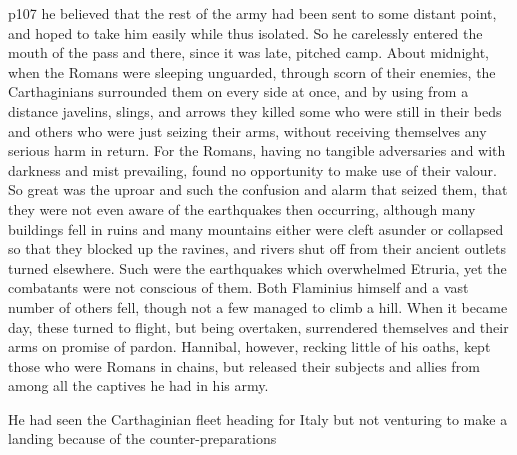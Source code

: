 p107 he believed that the rest of the army had been sent to some distant point, and hoped to take him easily while thus isolated. So he carelessly entered the mouth of the pass and there, since it was late, pitched camp. About midnight, when the Romans were sleeping unguarded, through scorn of their enemies, the Carthaginians surrounded them on every side at once, and by using from a distance javelins, slings, and arrows they killed some who were still in their beds and others who were just seizing their arms, without receiving themselves any serious harm in return. For the Romans, having no tangible adversaries and with darkness and mist prevailing, found no opportunity to make use of their valour. So great was the uproar and such the confusion and alarm that seized them, that they were not even aware of the earthquakes then occurring, although many buildings fell in ruins and many mountains either were cleft asunder or collapsed so that they blocked up the ravines, and rivers shut off from their ancient outlets turned elsewhere. Such were the earthquakes which overwhelmed Etruria, yet the combatants were not conscious of them. Both Flaminius himself and a vast number of others fell, though not a few managed to climb a hill. When it became day, these turned to flight, but being overtaken, surrendered themselves and their arms on promise of pardon. Hannibal, however, recking little of his oaths, kept those who were Romans in chains, but released their subjects and allies from among all the captives he had in his army.

He had seen the Carthaginian fleet heading for Italy but not venturing to make a landing because of the counter-preparations

